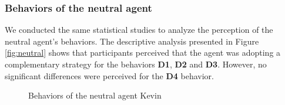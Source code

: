 \documentclass[10pt, a4paper]{article} %
\begin{document}
		\subsubsection{Behaviors of the neutral agent}
		
		We conducted the same statistical studies to analyze the perception of the neutral agent's behaviors. The descriptive analysis presented in Figure \ref{fig:neutral} shows that participants perceived that the agent was adopting a complementary strategy for the behaviors \textbf{D1}, \textbf{D2} and \textbf{D3}. However, no significant differences were perceived for the \textbf{D4} behavior.
		
			\begin{figure}[!tb]
				\centering
				
				\caption{Behaviors of the neutral agent Kevin}
				\label{fig:neutre}
			\end{figure}
		
\end{document}
